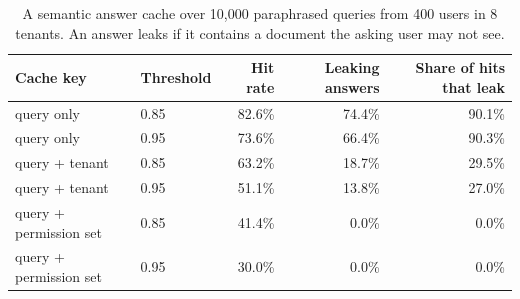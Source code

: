 \begin{table}[t]
\centering
\caption{A semantic answer cache over 10{,}000 paraphrased queries from 400 users in 8 tenants. An answer leaks if it contains a document the asking user may not see.}
\label{tab:cache}
\small
\setlength{\tabcolsep}{4pt}
\begin{tabular}{llrrr}
\toprule
Cache key & Threshold & Hit rate & Leaking answers & Share of hits that leak \\
\midrule
query only & 0.85 & 82.6\% & 74.4\% & 90.1\% \\
query only & 0.95 & 73.6\% & 66.4\% & 90.3\% \\
query + tenant & 0.85 & 63.2\% & 18.7\% & 29.5\% \\
query + tenant & 0.95 & 51.1\% & 13.8\% & 27.0\% \\
query + permission set & 0.85 & 41.4\% & 0.0\% & 0.0\% \\
query + permission set & 0.95 & 30.0\% & 0.0\% & 0.0\% \\
\bottomrule
\end{tabular}
\end{table}
